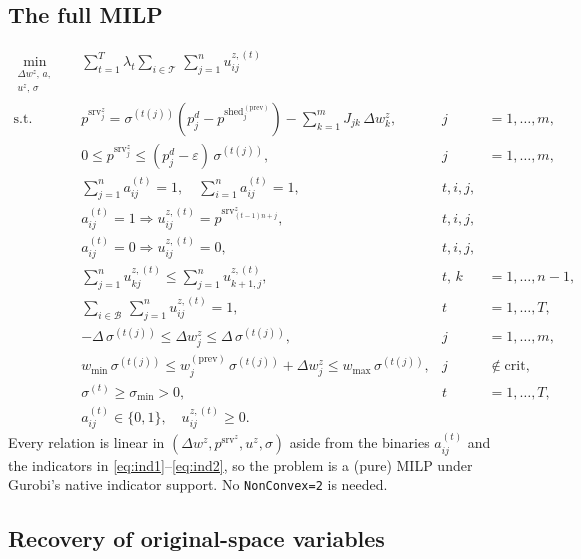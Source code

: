 \documentclass[11pt]{article}
\newcommand{\pshed}{p^{\mathrm{shed}}}
\newcommand{\pserved}{p^{\mathrm{srv}}}
\newcommand{\pprev}{\pshed^{(\mathrm{prev})}}
\newcommand{\wprev}{w^{(\mathrm{prev})}}
\newcommand{\Top}{\mathcal{T}}
\newcommand{\Bot}{\mathcal{B}}
\begin{document}
\subsection{The full MILP}

\begin{align}
    \min_{\substack{\Delta w^{z},\,a,\\u^{z},\,\sigma}}
    \quad &
    \sum_{t=1}^{T} \lambda_{t} \sum_{i\in\Top}\,\sum_{j=1}^{n} u^{z,(t)}_{ij}
    \label{eq:formal-full}\\
    \text{s.t.}\quad
    & \pserved^{z}_{j}
        = \sigma^{(t(j))}(p^{d}_{j} - \pprev_{j}) - \sum_{k=1}^{m} J_{jk}\,\Delta w^{z}_{k},
        & j &= 1,\dots,m,\nonumber\\
    & 0 \le \pserved^{z}_{j} \le (p^{d}_{j} - \varepsilon)\,\sigma^{(t(j))},
        & j &= 1,\dots,m,\nonumber\\
    & \sum_{j=1}^{n} a^{(t)}_{ij} = 1,\quad \sum_{i=1}^{n} a^{(t)}_{ij} = 1,
        & t,i,j,\nonumber\\
    & a^{(t)}_{ij} = 1 \Rightarrow u^{z,(t)}_{ij} = \pserved^{z}_{(t-1)n + j},
        & t,i,j,\nonumber\\
    & a^{(t)}_{ij} = 0 \Rightarrow u^{z,(t)}_{ij} = 0,
        & t,i,j,\nonumber\\
    & \sum_{j=1}^{n} u^{z,(t)}_{kj} \le \sum_{j=1}^{n} u^{z,(t)}_{k+1,j},
        & t,\, k &= 1,\dots,n-1,\nonumber\\
    & \sum_{i\in\Bot}\,\sum_{j=1}^{n} u^{z,(t)}_{ij} = 1,
        & t &= 1,\dots,T,\nonumber\\
    & -\Delta\,\sigma^{(t(j))} \le \Delta w^{z}_{j} \le \Delta\,\sigma^{(t(j))},
        & j &= 1,\dots,m,\nonumber\\
    & w_{\min}\,\sigma^{(t(j))}
        \le \wprev_{j}\,\sigma^{(t(j))} + \Delta w^{z}_{j}
        \le w_{\max}\,\sigma^{(t(j))},
        & j &\notin \mathrm{crit},\nonumber\\
    & \sigma^{(t)} \ge \sigma_{\min} > 0,
        & t &= 1,\dots,T,\nonumber\\
    & a^{(t)}_{ij} \in \{0,1\},\quad u^{z,(t)}_{ij} \ge 0.\nonumber
\end{align}
Every relation is linear in $(\Delta w^{z}, \pserved^{z}, u^{z}, \sigma)$ aside
from the binaries $a^{(t)}_{ij}$ and the indicators in \eqref{eq:ind1}--\eqref{eq:ind2},
so the problem is a (pure) MILP under Gurobi's native indicator support.
No \texttt{NonConvex=2} is needed.

\subsection{Recovery of original-space variables}
\end{document}
